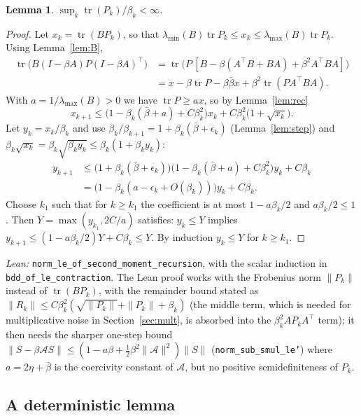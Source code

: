 \documentclass[11pt]{article}
\newtheorem{lemma}[theorem]{Lemma}
\theoremstyle{definition}
\theoremstyle{remark}
\DeclareMathOperator{\tr}{tr}
\begin{document}
\begin{lemma}\label{lem:apriori}
$\sup_k \tr(P_k)/\beta_k < \infty$.
\end{lemma}
\begin{proof}
Let $x_k = \tr(BP_k)$, so that $\lambda_{\min}(B)\tr P_k \le x_k \le \lambda_{\max}(B)\tr P_k$.
Using Lemma~\ref{lem:B},
\begin{align*}
  \tr\!\big(B(I - \beta A)P(I - \beta A)^\top\big)
  &= \tr\!\big(P\,[B - \beta(A^\top B + BA) + \beta^2A^\top BA]\big) \\
  &= x - \beta\tr P - \beta\bar\beta x + \beta^2\tr(PA^\top BA).
\end{align*}
With $a = 1/\lambda_{\max}(B) > 0$ we have $\tr P \ge ax$, so by Lemma~\ref{lem:rec}
\[
  x_{k+1} \le \big(1 - \beta_k(\bar\beta + a) + C\beta_k^2\big)x_k + C\beta_k^2\big(1 + \sqrt{x_k}\big).
\]
Let $y_k = x_k/\beta_k$ and use $\beta_k/\beta_{k+1} = 1 + \beta_k(\bar\beta + \epsilon_k)$
(Lemma~\ref{lem:step}) and $\beta_k\sqrt{x_k} = \beta_k\sqrt{\beta_ky_k} \le \beta_k(1 + \beta_ky_k)$:
\begin{align*}
  y_{k+1} &\le \big(1 + \beta_k(\bar\beta + \epsilon_k)\big)\big(1 - \beta_k(\bar\beta + a) + C\beta_k^2\big)y_k
    + C\beta_k \\
  &= \big(1 - \beta_k(a - \epsilon_k + O(\beta_k))\big)y_k + C\beta_k .
\end{align*}
Choose $k_1$ such that for $k \ge k_1$ the coefficient is at most $1 - a\beta_k/2$ and
$a\beta_k/2 \le 1$. Then $Y = \max(y_{k_1}, 2C/a)$ satisfies: $y_k \le Y$ implies
$y_{k+1} \le (1 - a\beta_k/2)Y + C\beta_k \le Y$. By induction $y_k \le Y$ for $k \ge k_1$.
\end{proof}
\noindent\emph{Lean:} \texttt{norm\_le\_of\_second\_moment\_recursion}, with the scalar
induction in \texttt{bdd\_of\_le\_contraction}. The Lean proof works with the Frobenius norm
$\|P_k\|$ instead of $\tr(BP_k)$, with the remainder bound stated as
$\|R_k\| \le C\beta_k^2(\sqrt{\|P_k\|} + \|P_k\| + \beta_k)$ (the middle term, which is needed
for multiplicative noise in Section~\ref{sec:mult}, is absorbed into the $\beta_k^2AP_kA^\top$
term); it then needs the sharper one-step bound
$\|S - \beta\mathcal AS\| \le (1 - a\beta + \tfrac12\beta^2\|\mathcal A\|^2)\|S\|$
(\texttt{norm\_sub\_smul\_le'}) where $a = 2\eta + \bar\beta$ is the coercivity constant of
$\mathcal A$, but no positive semidefiniteness of $P_k$.

\subsection{A deterministic lemma}
\end{document}
